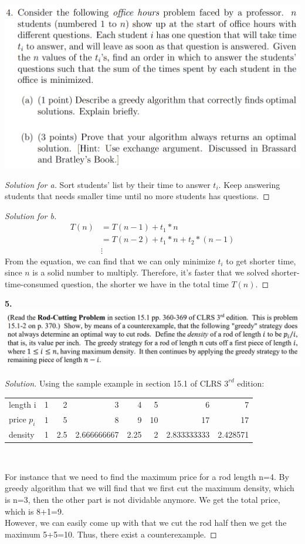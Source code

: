\documentclass[12pt]{article}
\begin{document}
\includegraphics[scale=0.4]{4.png}\\
\begin{proof}[Solution for a]
	Sort students' list by their time to answer $t_i$. Keep answering students that needs smaller time until no more students has questions.
\end{proof}
\begin{proof}[Solution for b]
	\begin{align*}
		T(n)&=T(n-1)+t_1*n\\
		&=T(n-2)+t_1*n+t_2*(n-1)\\
		&\vdots
	\end{align*}
	From the equation, we can find that we can only minimize $t_i$ to get shorter time, since $n$ is a solid number to multiply. Therefore, it's faster that we solved shorter-time-consumed question, the shorter we have in the total time $T(n)$.
\end{proof}
\textbf{5.}\\
\includegraphics[scale=0.35]{5.png}\\
\begin{proof}[Solution]
	Using the sample example in section 15.1 of CLRS $3^{rd}$ edition:
	\centering
	    \begin{tabular}{lrrrrrrr}
		length i & 1     & 2     & 3     & 4     & 5     & 6     & 7 \\
		price $p_i$ & 1     & 5     & 8     & 9     & 10    & 17    & 17 \\
		density & 1     & 2.5   & 2.666666667 & 2.25  & 2     & 2.833333333 & 2.428571 \\
	\end{tabular}\\
	\raggedright
	For instance that we need to find the maximum price for a rod length n=4. By greedy algorithm that we will find that we first cut the maximum density, which is n=3, then the other part is not dividable anymore. We get the total price, which is 8+1=9.\\
	However, we can easily come up with that we cut the rod half then we get the maximum 5+5=10. Thus, there exist a counterexample.
\end{proof}
\end{document}
